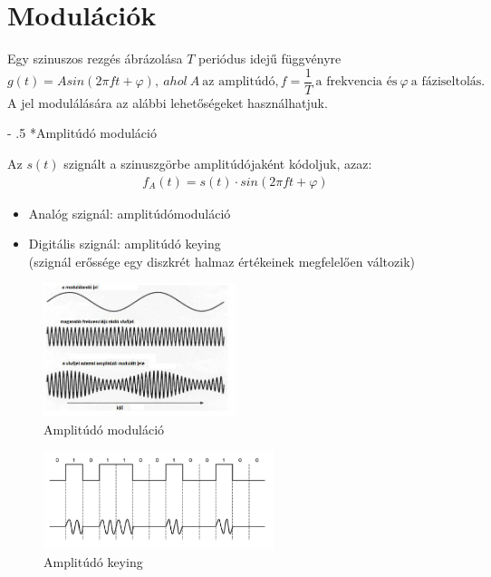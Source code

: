 \documentclass[12pt]{article}
\makeatletter
\renewcommand\paragraph{%
	\@startsection{paragraph}{4}{0mm}%
	{-\baselineskip}%
	{.5\baselineskip}%
	{\normalfont\normalsize\bfseries}}
\makeatother
\begin{document}
    \section*{Modulációk}

        Egy szinuszos rezgés ábrázolása $T$ periódus idejű függvényre
        \[
            g(t)=Asin(2\pi f t + \varphi),\ ahol\ A\ \text{az amplitúdó}, f = \frac{1}{T}\ \text{a frekvencia és}\ \varphi\ \text{a fáziseltolás}.
        \]
        A jel modulálására az alábbi lehetőségeket használhatjuk.
						
        \paragraph*{Amplitúdó moduláció}

        Az $s(t)$ szignált a szinuszgörbe amplitúdójaként kódoljuk, azaz:
        \begin{align*}
            f_A(t) = s(t) \cdot sin(2\pi f t + \varphi)
        \end{align*}

	   \begin{itemize}[leftmargin=7.5mm]
            \renewcommand{\labelitemi}{$\vcenter{\hbox{\tiny$\bullet$}}$}
            \item Analóg szignál: amplitúdómoduláció
            \item Digitális szignál: amplitúdó keying\\
            (szignál erőssége egy diszkrét halmaz értékeinek megfelelően változik)
        \end{itemize}

        \begin{figure}[H]
            \centering
            \includegraphics[width=0.5\textwidth]{img/amplitudo_mod.png}
            \caption{Amplitúdó moduláció}
        \end{figure}

        \begin{figure}[H]
            \centering
            \includegraphics[width=0.6\textwidth]{img/amplitudo_key.png}
            \caption{Amplitúdó keying}
        \end{figure}
\end{document}
